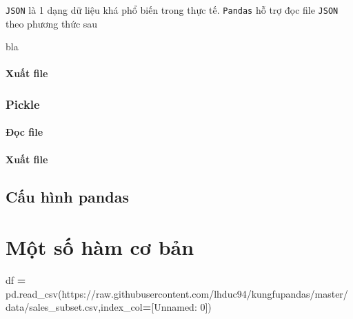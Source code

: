 \documentclass[
]{book}
\newenvironment{Shaded}{\begin{snugshade}}{\end{snugshade}}
\newcommand{\NormalTok}[1]{#1}
\newcommand{\OperatorTok}[1]{\textcolor[rgb]{0.81,0.36,0.00}{\textbf{#1}}}
\newcommand{\StringTok}[1]{\textcolor[rgb]{0.31,0.60,0.02}{#1}}
\begin{document}
\texttt{JSON} là 1 dạng dữ liệu khá phổ biến trong thực tế. \texttt{Pandas} hỗ trợ đọc file \texttt{JSON} theo phương thức sau

\begin{Shaded}
\begin{Highlighting}[]
\NormalTok{bla}
\end{Highlighting}
\end{Shaded}

\hypertarget{xuux1ea5t-file-1}{%
\subsubsection{Xuất file}\label{xuux1ea5t-file-1}}

\hypertarget{pickle}{%
\subsection{Pickle}\label{pickle}}

\hypertarget{ux111ux1ecdc-file-2}{%
\subsubsection{Đọc file}\label{ux111ux1ecdc-file-2}}

\hypertarget{xuux1ea5t-file-2}{%
\subsubsection{Xuất file}\label{xuux1ea5t-file-2}}

\hypertarget{cux1ea5u-huxecnh-pandas}{%
\section{Cấu hình pandas}\label{cux1ea5u-huxecnh-pandas}}

\hypertarget{Chuong-3}{%
\chapter{Một số hàm cơ bản}\label{Chuong-3}}

\begin{Shaded}
\begin{Highlighting}[]
\NormalTok{df }\OperatorTok{=}\NormalTok{ pd.read\_csv(}\StringTok{\textquotesingle{}https://raw.githubusercontent.com/lhduc94/kungfupandas/master/data/sales\_subset.csv\textquotesingle{}}\NormalTok{,index\_col}\OperatorTok{=}\NormalTok{[}\StringTok{\textquotesingle{}Unnamed: 0\textquotesingle{}}\NormalTok{])}
\end{Highlighting}
\end{Shaded}
\end{document}
